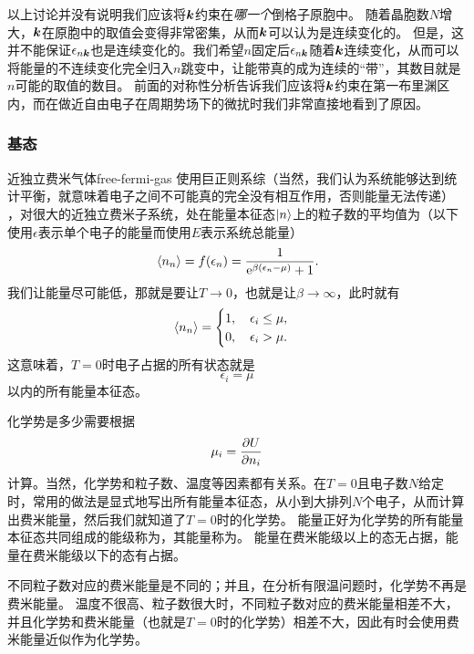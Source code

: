 以上讨论并没有说明我们应该将$\vb*{k}$约束在\emph{哪一个}倒格子原胞中。
随着晶胞数$N$增大，$\vb*{k}$在原胞中的取值会变得非常密集，从而$\vb*{k}$可以认为是连续变化的。
但是，这并不能保证$\epsilon_{n \vb*{k}}$也是连续变化的。我们希望$n$固定后$\epsilon_{n \vb*{k}}$随着$\vb*{k}$连续变化，从而可以将能量的不连续变化完全归入$n$跳变中，让能带真的成为连续的“带”，其数目就是$n$可能的取值的数目。
前面的对称性分析告诉我们应该将$\vb*{k}$约束在第一布里渊区内，而在做近自由电子在周期势场下的微扰时我们非常直接地看到了原因。

\subsubsection{基态} 

\begin{back}{近独立费米气体}{free-fermi-gas}
    使用巨正则系综（当然，我们认为系统能够达到统计平衡，就意味着电子之间不可能真的完全没有相互作用，否则能量无法传递）
    ，对很大的近独立费米子系统，处在能量本征态$\ket{n}$上的粒子数的平均值为（以下使用$\epsilon$表示单个电子的能量而使用$E$表示系统总能量）
    \begin{equation}
        \expval*{{n}_n} = f(\epsilon_n) = \frac{1}{\mathrm{e}^{\beta (\epsilon_n-\mu)} + 1}.
        \label{eq:fermi-dirac-distribution}
    \end{equation}
    我们让能量尽可能低，那就是要让$T\to 0$，也就是让$\beta\to \infty$，此时就有
    \begin{equation}
        \expval*{{n}_n} = \begin{cases}
            1, \quad \epsilon_i \leq \mu, \\
            0, \quad \epsilon_i > \mu.
        \end{cases}
    \end{equation}
    这意味着，$T=0$时电子占据的所有状态就是
    \begin{equation}
        \epsilon_i = \mu
    \end{equation}
    以内的所有能量本征态。

    化学势是多少需要根据
    \begin{equation}
        \mu_i = \pdv{U}{n_i}
    \end{equation}
    计算。当然，化学势和粒子数、温度等因素都有关系。在$T=0$且电子数$N$给定时，常用的做法是显式地写出所有能量本征态，从小到大排列$N$个电子，从而计算出费米能量，然后我们就知道了$T=0$时的化学势。
    能量正好为化学势的所有能量本征态共同组成的能级称为，其能量称为。
    能量在费米能级以上的态无占据，能量在费米能级以下的态有占据。

    不同粒子数对应的费米能量是不同的；并且，在分析有限温问题时，化学势不再是费米能量。
    温度不很高、粒子数很大时，不同粒子数对应的费米能量相差不大，并且化学势和费米能量（也就是$T=0$时的化学势）相差不大，因此有时会使用费米能量近似作为化学势。
\end{back}

